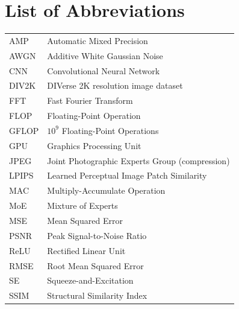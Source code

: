 \chapter*{List of Abbreviations}
\begin{tabular}{@{}ll@{}}
AMP    & Automatic Mixed Precision \\
AWGN   & Additive White Gaussian Noise \\
CNN    & Convolutional Neural Network \\
DIV2K  & DIVerse 2K resolution image dataset \\
FFT    & Fast Fourier Transform \\
FLOP   & Floating-Point Operation \\
GFLOP  & $10^9$ Floating-Point Operations \\
GPU    & Graphics Processing Unit \\
JPEG   & Joint Photographic Experts Group (compression) \\
LPIPS  & Learned Perceptual Image Patch Similarity \\
MAC    & Multiply-Accumulate Operation \\
MoE    & Mixture of Experts \\
MSE    & Mean Squared Error \\
PSNR   & Peak Signal-to-Noise Ratio \\
ReLU   & Rectified Linear Unit \\
RMSE   & Root Mean Squared Error \\
SE     & Squeeze-and-Excitation \\
SSIM   & Structural Similarity Index \\
\end{tabular}
